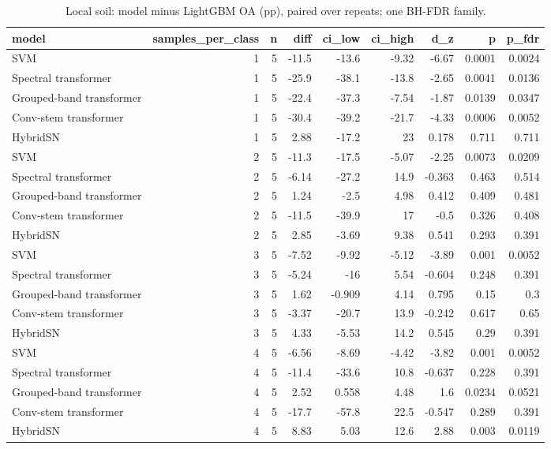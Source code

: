 \begin{table}
\caption{Local soil: model minus LightGBM OA (pp), paired over repeats; one BH-FDR family.}
\label{tab:stats_local_vs_lightgbm}
\begin{tabular}{lrrrrrrrr}
\toprule
model & samples\_per\_class & n & diff & ci\_low & ci\_high & d\_z & p & p\_fdr \\
\midrule
SVM & 1 & 5 & -11.5 & -13.6 & -9.32 & -6.67 & 0.0001 & 0.0024 \\
Spectral transformer & 1 & 5 & -25.9 & -38.1 & -13.8 & -2.65 & 0.0041 & 0.0136 \\
Grouped-band transformer & 1 & 5 & -22.4 & -37.3 & -7.54 & -1.87 & 0.0139 & 0.0347 \\
Conv-stem transformer & 1 & 5 & -30.4 & -39.2 & -21.7 & -4.33 & 0.0006 & 0.0052 \\
HybridSN & 1 & 5 & 2.88 & -17.2 & 23 & 0.178 & 0.711 & 0.711 \\
SVM & 2 & 5 & -11.3 & -17.5 & -5.07 & -2.25 & 0.0073 & 0.0209 \\
Spectral transformer & 2 & 5 & -6.14 & -27.2 & 14.9 & -0.363 & 0.463 & 0.514 \\
Grouped-band transformer & 2 & 5 & 1.24 & -2.5 & 4.98 & 0.412 & 0.409 & 0.481 \\
Conv-stem transformer & 2 & 5 & -11.5 & -39.9 & 17 & -0.5 & 0.326 & 0.408 \\
HybridSN & 2 & 5 & 2.85 & -3.69 & 9.38 & 0.541 & 0.293 & 0.391 \\
SVM & 3 & 5 & -7.52 & -9.92 & -5.12 & -3.89 & 0.001 & 0.0052 \\
Spectral transformer & 3 & 5 & -5.24 & -16 & 5.54 & -0.604 & 0.248 & 0.391 \\
Grouped-band transformer & 3 & 5 & 1.62 & -0.909 & 4.14 & 0.795 & 0.15 & 0.3 \\
Conv-stem transformer & 3 & 5 & -3.37 & -20.7 & 13.9 & -0.242 & 0.617 & 0.65 \\
HybridSN & 3 & 5 & 4.33 & -5.53 & 14.2 & 0.545 & 0.29 & 0.391 \\
SVM & 4 & 5 & -6.56 & -8.69 & -4.42 & -3.82 & 0.001 & 0.0052 \\
Spectral transformer & 4 & 5 & -11.4 & -33.6 & 10.8 & -0.637 & 0.228 & 0.391 \\
Grouped-band transformer & 4 & 5 & 2.52 & 0.558 & 4.48 & 1.6 & 0.0234 & 0.0521 \\
Conv-stem transformer & 4 & 5 & -17.7 & -57.8 & 22.5 & -0.547 & 0.289 & 0.391 \\
HybridSN & 4 & 5 & 8.83 & 5.03 & 12.6 & 2.88 & 0.003 & 0.0119 \\
\bottomrule
\end{tabular}
\end{table}
